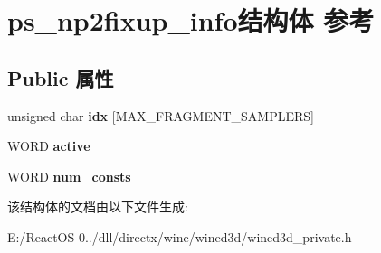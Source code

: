 \hypertarget{structps__np2fixup__info}{}\section{ps\+\_\+np2fixup\+\_\+info结构体 参考}
\label{structps__np2fixup__info}
\subsection*{Public 属性}
\begin{DoxyCompactItemize}
\item 
\mbox{\label{structps__np2fixup__info_a5e81cedc871ad55670b290bb12830e8f}} 
unsigned char {\bfseries idx} \mbox{[}M\+A\+X\+\_\+\+F\+R\+A\+G\+M\+E\+N\+T\+\_\+\+S\+A\+M\+P\+L\+E\+RS\mbox{]}
\item 
\mbox{\label{structps__np2fixup__info_a09e9cd02cb6f7b9331e238c39bb7a21e}} 
W\+O\+RD {\bfseries active}
\item 
\mbox{\label{structps__np2fixup__info_ab349618438a7ee79a3e35d344ba02337}} 
W\+O\+RD {\bfseries num\+\_\+consts}
\end{DoxyCompactItemize}


该结构体的文档由以下文件生成\+:\begin{DoxyCompactItemize}
\item 
E\+:/\+React\+O\+S-\/0../dll/directx/wine/wined3d/wined3d\+\_\+private.\+h\end{DoxyCompactItemize}
